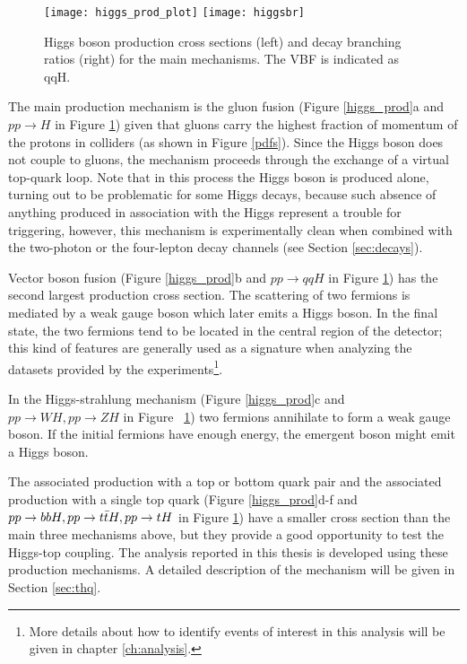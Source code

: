 \begin{figure}[!h]
\centering
\texttt{[image: higgs\_prod\_plot]}
\texttt{[image: higgsbr]}
\caption[Higgs boson production cross section and decay branching ratios]{Higgs boson production cross sections (left) and decay branching ratios (right) for the main mechanisms. The VBF is indicated as qqH\cite{hcswg}.}
\label{hcs_br}
\end{figure}


The main production mechanism is the gluon fusion (Figure \ref{higgs_prod}a and $pp\to H$ in Figure \ref{hcs_br}) given that gluons carry the highest fraction of momentum of the protons in \pp colliders (as shown in Figure \ref{pdfs}). Since the Higgs boson does not couple to gluons, the mechanism proceeds through the exchange of a virtual top-quark loop. Note that in this process the Higgs boson is produced alone, turning out to be problematic for some Higgs decays, because such absence of anything produced in association with the Higgs represent a trouble for triggering, however, this mechanism is experimentally clean when combined with the two-photon or the four-lepton decay channels (see Section \ref{sec:decays}). 

Vector boson fusion (Figure \ref{higgs_prod}b and $pp\to qqH$ in Figure \ref{hcs_br}) has the second largest production cross section. The scattering of two fermions is mediated by a weak gauge boson which later emits a Higgs boson. In the final state, the two fermions tend to be located in the central region of the detector; this kind of features are generally used as a signature when analyzing the datasets provided by the experiments\footnote{More details about how to identify events of interest in this analysis will be given in chapter \ref{ch:analysis}.}. 

In the Higgs-strahlung mechanism (Figure \ref{higgs_prod}c and ~$pp\to WH, pp\to ZH$ in Figure ~\ref{hcs_br}) two fermions annihilate to form a weak gauge boson. If the initial fermions have enough energy, the emergent boson might emit a Higgs boson.

The associated production with a top or bottom quark pair and the associated production with a single top quark (Figure \ref{higgs_prod}d-f and ~$pp\to bbH, pp\to t\bar{t}H, pp\to tH$ in Figure \ref{hcs_br}) have a smaller cross section than the main three mechanisms above, but they provide a good opportunity to test the Higgs-top coupling. The analysis reported in this thesis is developed using these production mechanisms. A detailed description of the \tH mechanism will be given in Section \ref{sec:thq}.  


